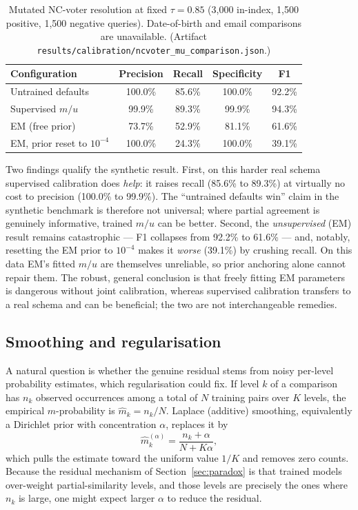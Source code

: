 \documentclass[11pt]{article}
\begin{document}
\begin{table}[h]
\centering
\caption{Mutated NC-voter resolution at fixed $\tau=0.85$ (3{,}000 in-index, 1{,}500
positive, 1{,}500 negative queries). Date-of-birth and email comparisons are unavailable.
(Artifact \texttt{results/calibration/ncvoter\_mu\_comparison.json}.)}
\label{tab:real}
\begin{tabular}{lcccc}
\toprule
Configuration & Precision & Recall & Specificity & F1 \\
\midrule
Untrained defaults & 100.0\% & 85.6\% & 100.0\% & 92.2\% \\
Supervised $m/u$ & 99.9\% & 89.3\% & 99.9\% & 94.3\% \\
EM (free prior) & 73.7\% & 52.9\% & 81.1\% & 61.6\% \\
EM, prior reset to $10^{-4}$ & 100.0\% & 24.3\% & 100.0\% & 39.1\% \\
\bottomrule
\end{tabular}
\end{table}

Two findings qualify the synthetic result. First, on this harder real schema supervised
calibration does \emph{help}: it raises recall (85.6\% to 89.3\%) at virtually no cost to
precision (100.0\% to 99.9\%). The ``untrained defaults win'' claim in the synthetic
benchmark is therefore not universal; where partial agreement is genuinely informative,
trained $m/u$ can be better. Second, the \emph{unsupervised} (EM) result remains
catastrophic --- F1 collapses from 92.2\% to 61.6\% --- and, notably, resetting the EM prior
to $10^{-4}$ makes it \emph{worse} (39.1\%) by crushing recall. On this data EM's fitted
$m/u$ are themselves unreliable, so prior anchoring alone cannot repair them. The robust,
general conclusion is that freely fitting EM parameters is dangerous without joint
calibration, whereas supervised calibration transfers to a real schema and can be
beneficial; the two are not interchangeable remedies.

\subsection{Smoothing and regularisation}
\label{sec:smoothing}
A natural question is whether the genuine residual stems from noisy per-level probability
estimates, which regularisation could fix. If level $k$ of a comparison has $n_k$ observed
occurrences among a total of $N$ training pairs over $K$ levels, the empirical
$m$-probability is $\hat m_k=n_k/N$. Laplace (additive) smoothing, equivalently a Dirichlet
prior with concentration $\alpha$, replaces it by
\begin{equation}
\hat m_k^{(\alpha)}=\frac{n_k+\alpha}{N+K\alpha},
\end{equation}
which pulls the estimate toward the uniform value $1/K$ and removes zero counts. Because the
residual mechanism of Section~\ref{sec:paradox} is that trained models over-weight
partial-similarity levels, and those levels are precisely the ones where $n_k$ is large, one
might expect larger $\alpha$ to reduce the residual.
\end{document}
